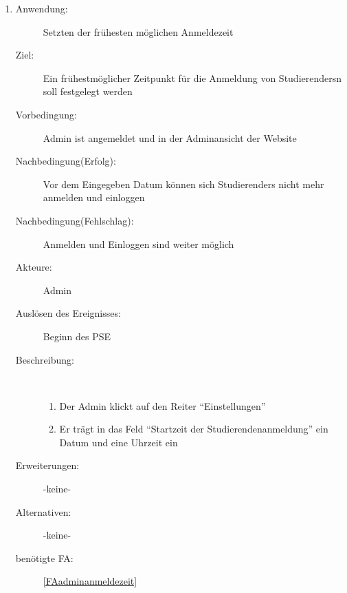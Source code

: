 \documentclass[parskip=full]{scrartcl}
\newcommand{\swtLabel}[1]{\textbf{/#1\arabic*0/}}
\begin{document}
\begin{enumerate} [label=\swtLabel{A}]
	\item
	\begin{description}
		\item[Anwendung:] Setzten der frühesten möglichen Anmeldezeit
		\item[Ziel:] Ein frühestmöglicher Zeitpunkt für die Anmeldung von \glspl{Studierender}n soll festgelegt werden
		\item[Vorbedingung:] \gls{Admin} ist angemeldet und in der Adminansicht der Website
		\item[Nachbedingung(Erfolg):] Vor dem Eingegeben Datum können sich \glspl{Studierender} nicht mehr anmelden und einloggen 
		\item[Nachbedingung(Fehlschlag):] Anmelden und Einloggen sind weiter möglich
		\item[Akteure:] \gls{Admin}
		\item[Auslösen des Ereignisses:] Beginn des \gls{PSE}
		\item[Beschreibung:]~
		\begin{enumerate}[label=\arabic*.]
			\item Der \gls{Admin} klickt auf den Reiter \enquote{Einstellungen}
			\item Er trägt in das Feld \enquote{Startzeit der Studierendenanmeldung} ein Datum und eine Uhrzeit ein
		\end{enumerate}
		\item[Erweiterungen:] -keine-
		\item[Alternativen:] -keine-
		\item[benötigte FA:] \ref{FAadminanmeldezeit}
	\end{description}
	

\end{enumerate}
\end{document}
